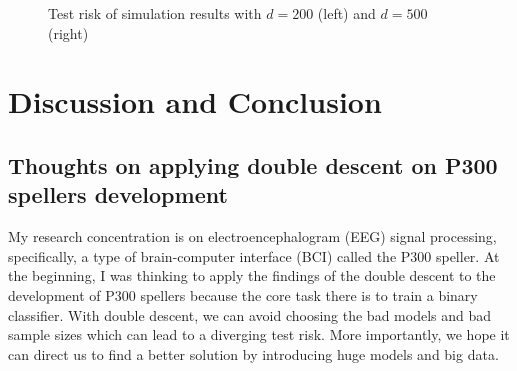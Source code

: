 \documentclass{article}
\begin{document}
\vspace{-5mm}
\begin{figure}[H]
	\centering
	\qquad
	\hspace{-8mm}
	\caption{Test risk of simulation results with $d=200$ (left) and $d=500$ (right)}
	\label{fig:2}
\end{figure}


\section{Discussion and Conclusion} \label{Conclusion}
\subsection{Thoughts on applying double descent on P300 spellers development}
My research concentration is on electroencephalogram (EEG) signal processing, specifically, a type of brain-computer interface (BCI) called the P300 speller. At the beginning, I was thinking to apply the findings of the double descent to the development of P300 spellers because the core task there is to train a binary classifier. With double descent, we can avoid choosing the bad models and bad sample sizes which can lead to a diverging test risk. More importantly, we hope it can direct us to find a better solution by introducing huge models and big data.\\
\end{document}
